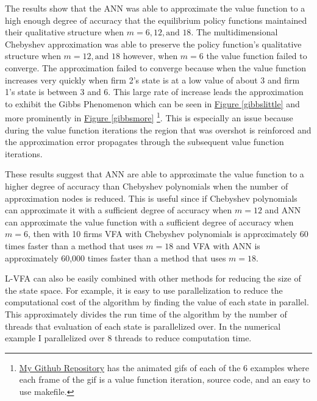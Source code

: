 \documentclass[12pt]{article}
\begin{document}
The results show that the ANN was able to approximate the value function to a high enough degree of accuracy that the equilibrium policy functions maintained their qualitative structure when $m=6,12,\text{and }18$. The multidimensional Chebyshev approximation was able to preserve the policy function's qualitative structure when $m=12, \text{and } 18$ however, when $m=6$ the value function failed to converge. The approximation failed to converge because when the value function increases very quickly when firm 2's state is at a low value of about 3 and firm 1's state is between 3 and 6. This large rate of increase leads the approximation to exhibit the Gibbs Phenomenon which can be seen in \hyperref[gibbslittle]{Figure \ref{gibbslittle}} and more prominently in  \hyperref[gibbsmore]{Figure \ref{gibbsmore}} \footnote{\href{https://github.com/wmjones/VFA-for-dynamic-games}{My Github Repository} has the animated gifs of each of the 6 examples where each frame of the gif is a value function iteration, source code, and an easy to use makefile.}. This is especially an issue because during the value function iterations the region that was overshot is reinforced and the approximation error propagates through the subsequent value function iterations.

These results suggest that ANN are able to approximate the value function to a higher degree of accuracy than Chebyshev polynomials when the number of approximation nodes is reduced. This is useful since if Chebyshev polynomials can approximate it with a sufficient degree of accuracy when $m=12$ and ANN can approximate the value function with a sufficient degree of accuracy when $m=6$, then with 10 firms VFA with Chebyshev polynomials is approximately 60 times faster than a method that uses $m=18$ and VFA with ANN is approximately 60,000 times faster than a method that uses $m=18$.

L-VFA can also be easily combined with other methods for reducing the size of the state space. For example, it is easy to use parallelization to reduce the computational cost of the algorithm by finding the value of each state in parallel. This approximately divides the run time of the algorithm by the number of threads that evaluation of each state is parallelized over. In the numerical example I parallelized over 8 threads to reduce computation time.
\end{document}
